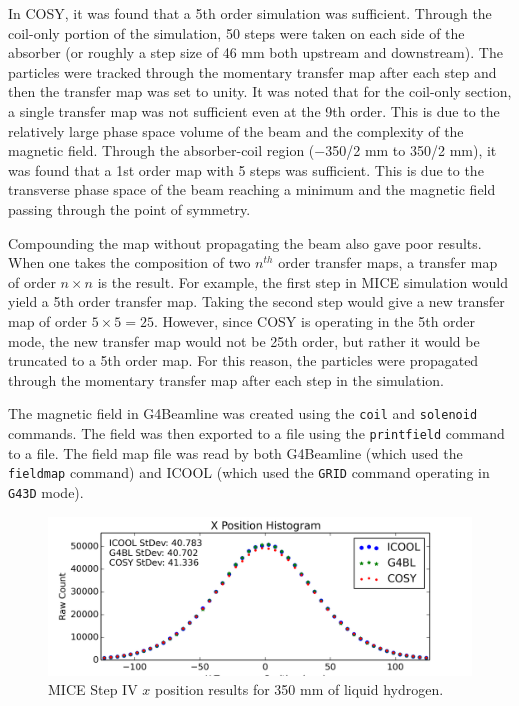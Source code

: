 \documentclass[a4paper,11pt]{article}
\begin{document}
In COSY, it was found that a 5th order simulation was sufficient. Through the coil-only portion of the simulation, 50 steps were taken on each side of the absorber (or roughly a step size of 46 mm both upstream and downstream). The particles were tracked through the momentary transfer map after each step and then the transfer map was set to unity. It was noted that for the coil-only section, a single transfer map was not sufficient even at the 9th order. This is due to the relatively large phase space volume of the beam and the complexity of the magnetic field. Through the absorber-coil region ($-$350/2 mm to 350/2 mm), it was found that a 1st order map with 5 steps was sufficient. This is due to the transverse phase space of the beam reaching a minimum and the magnetic field passing through the point of symmetry.

Compounding the map without propagating the beam also gave poor results. When one takes the composition of two $n^{th}$ order transfer maps, a transfer map of order $n\times n$ is the result. For example, the first step in MICE simulation would yield a 5th order transfer map. Taking the second step would give a new transfer map of order $5\times 5 = 25$. However, since COSY is operating in the 5th order mode, the new transfer map would not be 25th order, but rather it would be truncated to a 5th order map. For this reason, the particles were propagated through the momentary transfer map after each step in the simulation.

The magnetic field in G4Beamline was created using the \texttt{coil} and \texttt{solenoid} commands. The field was then exported to a file using the \texttt{printfield} command to a file. The field map file was read by both G4Beamline (which used the \texttt{fieldmap} command) and ICOOL (which used the \texttt{GRID} command operating in \texttt{G43D} mode).

\begin{figure}[htb]
  \centering
    \includegraphics[width=\columnwidth]{Figures/x} 
  \caption{MICE Step IV $x$ position results for 350 mm of liquid hydrogen.}
  \label{fig:micex}
\end{figure}
\end{document}
